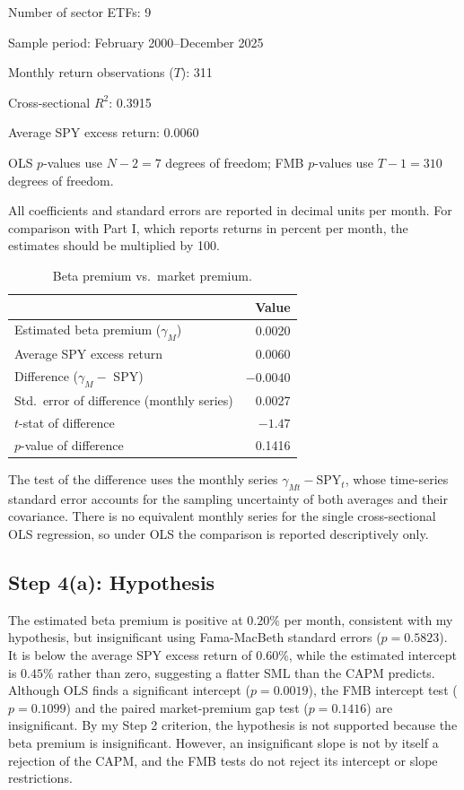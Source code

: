 \begin{tight}
\item Number of sector ETFs: 9
\item Sample period: February 2000--December 2025
\item Monthly return observations ($T$): 311
\item Cross-sectional $R^2$: 0.3915
\item Average SPY excess return: 0.0060
\item OLS $p$-values use $N - 2 = 7$ degrees of freedom; FMB $p$-values use
$T - 1 = 310$ degrees of freedom.
\end{tight}

All coefficients and standard errors are reported in decimal units per month.
For comparison with Part I, which reports returns in percent per month, the
estimates should be multiplied by 100.

\begin{table}[H]
\centering
\caption{Beta premium vs.\ market premium.}
\small
\begin{tabular}{lr}
\toprule
& Value \\
\midrule
Estimated beta premium ($\gamma_M$) & 0.0020 \\
Average SPY excess return & 0.0060 \\
Difference ($\gamma_M -$ SPY) & $-0.0040$ \\
Std.\ error of difference (monthly series) & 0.0027 \\
$t$-stat of difference & $-1.47$ \\
$p$-value of difference & 0.1416 \\
\bottomrule
\end{tabular}
\label{tab:capdiff}
\end{table}

The test of the difference uses the monthly series
$\gamma_{Mt} - \text{SPY}_t$, whose time-series standard error accounts for the
sampling uncertainty of both averages and their covariance. There is no
equivalent monthly series for the single cross-sectional OLS regression, so
under OLS the comparison is reported descriptively only.

\subsection{Step 4(a): Hypothesis}

The estimated beta premium is positive at $0.20\%$ per month, consistent with
my hypothesis, but insignificant using Fama-MacBeth standard errors
($p = 0.5823$). It is below the average SPY excess return of $0.60\%$, while
the estimated intercept is $0.45\%$ rather than zero, suggesting a flatter SML
than the CAPM predicts. Although OLS finds a significant intercept
($p = 0.0019$), the FMB intercept test ($p = 0.1099$) and the paired
market-premium gap test ($p = 0.1416$) are insignificant. By my Step 2
criterion, the hypothesis is not supported because the beta premium is
insignificant. However, an insignificant slope is not by itself a rejection of
the CAPM, and the FMB tests do not reject its intercept or slope restrictions.

